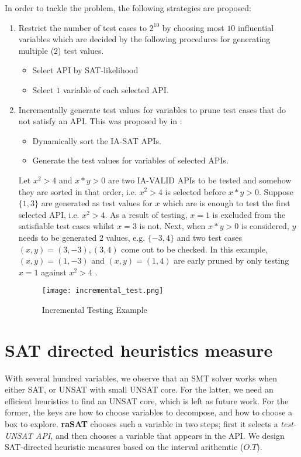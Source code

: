 In order to tackle the problem, the following strategies are proposed:
\begin{enumerate}
\item Restrict the number of test cases to $2^{10}$ by choosing most $10$ influential variables which are decided by the following procedures for generating multiple ($2$) test values.
\begin{itemize}
\item Select API by SAT-likelihood
\item Select $1$ variable of each selected API.
\end{itemize}
\item Incrementally generate test values for variables to prune test cases that do not satisfy an API. This was proposed by \citeauthor{khanhReport} in \cite{khanhReport}:
\begin{itemize}
\item Dynamically sort the IA-SAT APIs.
\item Generate the test values for variables of selected APIs.
\end{itemize}
\begin{example}
Let $x^2 > 4$ and $x*y > 0$ are two IA-VALID APIs to be tested and somehow they are sorted in that order, i.e. $x^2 > 4$ is selected before $x*y > 0$. Suppose $\{1, 3\}$ are generated as test values for $x$ which are is enough to test the first selected API, i.e. $x^2 > 4$. As a result of testing, $x = 1$ is excluded from the satisfiable test cases whilst $x = 3$ is not. Next, when $x*y > 0$ is considered, $y$ needs to be generated $2$ values, e.g. $\{-3, 4\}$ and two test cases $(x, y) = (3, -3), (3, 4)$ come out to be checked. In this example, $(x, y) = (1, -3)$ and  $(x, y) = (1, 4)$ are early pruned by only testing $x = 1$ against $x^2 > 4$ .
\end{example}
\begin{figure}[ht]
\centering
\texttt{[image: incremental\_test.png]} 
\caption{Incremental Testing Example} 
\label{fig:incremental-test} 
\end{figure} 
\end{enumerate}

\section{SAT directed heuristics measure} \label{sec:SATheuristics}

With several hundred variables, we observe that an SMT solver works 
when either SAT, or UNSAT with small UNSAT core.
%
For the latter, we need an efficient heuristics to find an UNSAT core, which is left as future work. 
For the former, the keys are how to choose variables to decompose, and 
how to choose a box to explore. 
{\bf raSAT} chooses such a variable in two steps; first it selects a {\em test-UNSAT API}, and
then chooses a variable that appears in the API. 
We design SAT-directed heuristic measures based on the interval arithemtic ($O.T$). 

